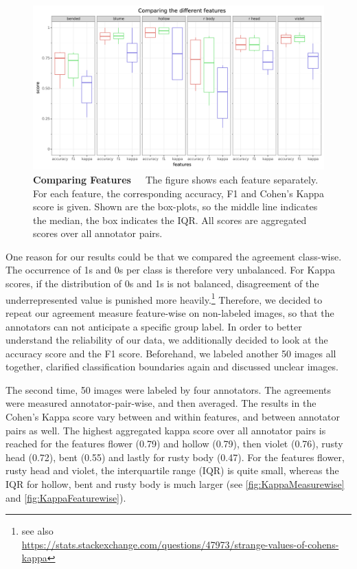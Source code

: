 \begin{figure}[!ht]
	\centering
	\includegraphics[scale=0.55]{Figures/chapter03/kappa_featurewise.png}
	\decoRule
	\caption[Feature-Wise Comparison of Agreement Measure Scores]{\textbf{Comparing Features}~~~The figure shows each feature separately. For each feature, the corresponding accuracy, F1 and Cohen’s Kappa score is given. Shown are the box-plots, so the middle line indicates the median, the box indicates the IQR. All scores are aggregated scores over all annotator pairs.}
	\label{fig:KappaFeaturewise}
\end{figure}

One reason for our results could be that we compared the agreement class-wise. The occurrence of 1s and 0s per class is therefore very unbalanced. For Kappa scores, if the distribution of 0s and 1s is not balanced, disagreement of the underrepresented value is punished more heavily.\footnote{see also \\ \url{https://stats.stackexchange.com/questions/47973/strange-values-of-cohens-kappa}} Therefore, we decided to repeat our agreement measure feature-wise on non-labeled images, so that the annotators can not anticipate a specific group label. In order to better understand the reliability of our data, we additionally decided to look at the accuracy score and the F1 score. Beforehand, we labeled another 50 images all together, clarified classification boundaries again and discussed unclear images.

\bigskip
The second time, 50 images were labeled by four annotators. The agreements were measured annotator-pair-wise, and then averaged. The results in the Cohen’s Kappa score vary between and within features, and between annotator pairs as well. The highest aggregated kappa score over all annotator pairs is reached for the features flower (0.79) and hollow (0.79), then violet (0.76), rusty head (0.72), bent (0.55) and lastly for rusty body (0.47).
For the features flower, rusty head and violet, the interquartile range (IQR) is quite small, whereas the IQR for hollow, bent and rusty body is much larger (see \autoref{fig:KappaMeasurewise} and \autoref{fig:KappaFeaturewise}).

